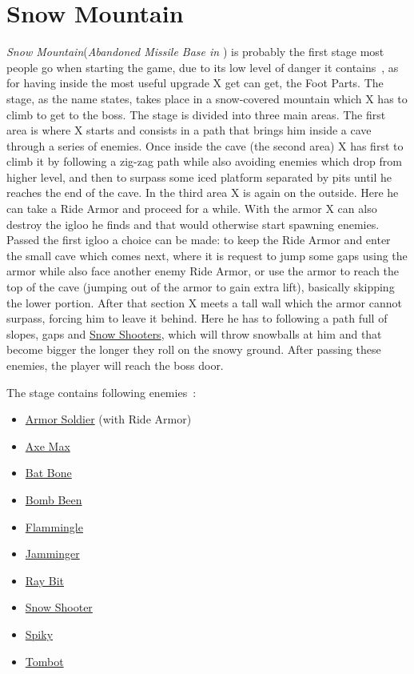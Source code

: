 \chapter{Snow Mountain}
\textit{Snow Mountain}(\textit{Abandoned Missile Base in \mhx}) is probably the first stage most people go when starting the game, due to its low level of danger it contains~\cite{stratwiki:Snow_mountain}, as for having inside the most useful upgrade X get can get, the Foot Parts. The stage, as the name states, takes place in a snow-covered mountain which X has to climb to get to the boss. The stage is divided into three main areas. The first area is where X starts and consists in a path that brings him inside a cave through a series of enemies. Once inside the cave (the second area) X has first to climb it by following a zig-zag path while also avoiding enemies which drop from higher level, and then to surpass some iced platform separated by pits until he reaches the end of the cave. In the third area X is again on the outside. Here he can take a Ride Armor and proceed for a while. With the armor X can also destroy the igloo he finds and that would otherwise start spawning enemies. Passed the first igloo a choice can be made: to keep the Ride Armor and enter the small cave which comes next, where it is request to jump some gaps using the armor while also face another enemy Ride Armor, or use the armor to reach the top of the cave (jumping out of the armor to gain extra lift), basically skipping the lower portion. After that section X meets a tall wall which the armor cannot surpass, forcing him to leave it behind. Here he has to following a path full of slopes, gaps and \hyperlink{enem:Snow_Shooter}{Snow Shooters}, which will throw snowballs at him and that become bigger the longer they roll on the snowy ground. After passing these enemies, the player will reach the boss door.

The stage contains following enemies~\cite{wiki:Snow_mountain}:
\begin{itemize}
	\item \hyperlink{enem:Armor_Soldier}{Armor Soldier} (with Ride Armor)
	\item \hyperlink{enem:Axe_Max}{Axe Max}
	\item \hyperlink{enem:Batton_Bone}{Bat Bone}
	\item \hyperlink{enem:Bomb_Been}{Bomb Been}
	\item \hyperlink{enem:Flammingle}{Flammingle}
	\item \hyperlink{enem:Jamminger}{Jamminger }
	\item \hyperlink{enem:Ray_Bit}{Ray Bit}
	\item \hyperlink{enem:Snow_Shooter}{Snow Shooter}
	\item \hyperlink{enem:Spiky}{Spiky}
	\item \hyperlink{enem:Tombot}{Tombot}
\end{itemize}

